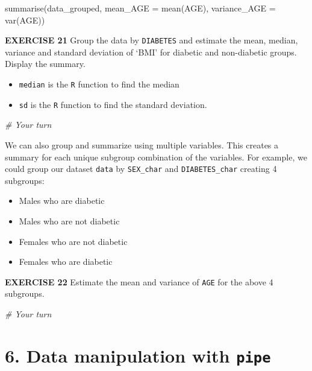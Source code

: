 \documentclass[
]{article}
\newenvironment{Shaded}{\begin{snugshade}}{\end{snugshade}}
\newcommand{\AttributeTok}[1]{\textcolor[rgb]{0.77,0.63,0.00}{#1}}
\newcommand{\CommentTok}[1]{\textcolor[rgb]{0.56,0.35,0.01}{\textit{#1}}}
\newcommand{\FunctionTok}[1]{\textcolor[rgb]{0.00,0.00,0.00}{#1}}
\newcommand{\NormalTok}[1]{#1}
\providecommand{\tightlist}{%
  \setlength{\itemsep}{0pt}\setlength{\parskip}{0pt}}
\begin{document}
\begin{Shaded}
\begin{Highlighting}[]
\FunctionTok{summarise}\NormalTok{(data\_grouped, }\AttributeTok{mean\_AGE =} \FunctionTok{mean}\NormalTok{(AGE), }\AttributeTok{variance\_AGE =} \FunctionTok{var}\NormalTok{(AGE))}
\end{Highlighting}
\end{Shaded}

\textbf{EXERCISE 21} Group the data by \texttt{DIABETES} and estimate
the mean, median, variance and standard deviation of `BMI' for diabetic
and non-diabetic groups. Display the summary.

\begin{itemize}
\tightlist
\item
  \texttt{median} is the \texttt{R} function to find the median
\item
  \texttt{sd} is the \texttt{R} function to find the standard deviation.
\end{itemize}

\begin{Shaded}
\begin{Highlighting}[]
\CommentTok{\# Your turn}
\end{Highlighting}
\end{Shaded}

We can also group and summarize using multiple variables. This creates a
summary for each unique subgroup combination of the variables. For
example, we could group our dataset \texttt{data} by \texttt{SEX\_char}
and \texttt{DIABETES\_char} creating 4 subgroups:

\begin{itemize}
\tightlist
\item
  Males who are diabetic
\item
  Males who are not diabetic
\item
  Females who are not diabetic
\item
  Females who are diabetic
\end{itemize}

\textbf{EXERCISE 22} Estimate the mean and variance of \texttt{AGE} for
the above 4 subgroups.

\begin{Shaded}
\begin{Highlighting}[]
\CommentTok{\# Your turn}
\end{Highlighting}
\end{Shaded}

\hypertarget{data-manipulation-with-pipe}{%
\section{\texorpdfstring{6. Data manipulation with
\texttt{pipe}}{6. Data manipulation with pipe}}\label{data-manipulation-with-pipe}}
\end{document}
